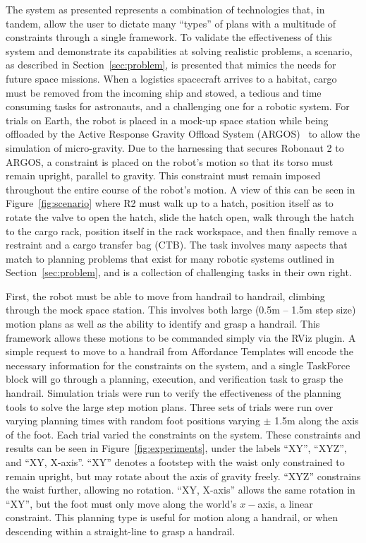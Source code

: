 
The system as presented represents a combination of technologies that, in tandem, allow the user to dictate many ``types'' of plans with a multitude of constraints through a single framework.
To validate the effectiveness of this system and demonstrate its capabilities at solving realistic problems, a scenario, as described in Section~\ref{sec:problem}, is presented that mimics the needs for future space missions.
When a logistics spacecraft arrives to a habitat, cargo must be removed from the incoming ship and stowed, a tedious and time consuming tasks for astronauts, and a challenging one for a robotic system.
For trials on Earth, the robot is placed in a mock-up space station while being offloaded by the Active Response Gravity Offload System (ARGOS)~\cite{Valle2011} to allow the simulation of micro-gravity.
Due to the harnessing that secures Robonaut 2 to ARGOS, a constraint is placed on the robot's motion so that its torso must remain upright, parallel to gravity.
This constraint must remain imposed throughout the entire course of the robot's motion.
A view of this can be seen in Figure~\ref{fig:scenario} where R2 must walk up to a hatch, position itself as to rotate the valve to open the hatch, slide the hatch open, walk through the hatch to the cargo rack, position itself in the rack workspace, and then finally remove a restraint and a cargo transfer bag (CTB).
The task involves many aspects that match to planning problems that exist for many robotic systems outlined in Section~\ref{sec:problem}, and is a collection of challenging tasks in their own right.

First, the robot must be able to move from handrail to handrail, climbing through the mock space station.
This involves both large (0.5m -- 1.5m step size) motion plans as well as the ability to identify and grasp a handrail.
This framework allows these motions to be commanded simply via the RViz plugin.
A simple request to move to a handrail from Affordance Templates will encode the necessary information for the constraints on the system, and a single TaskForce block will go through a planning, execution, and verification task to grasp the handrail.
Simulation trials were run to verify the effectiveness of the planning tools to solve the large step motion plans.
Three sets of trials were run over varying planning times with random foot positions varying $\pm$ 1.5m along the axis of the foot.
Each trial varied the constraints on the system.
These constraints and results can be seen in Figure~\ref{fig:experiments}, under the labels ``XY'', ``XYZ'', and ``XY, X-axis''.
``XY'' denotes a footstep with the waist only constrained to remain upright, but may rotate about the axis of gravity freely.
``XYZ'' constrains the waist further, allowing no rotation.
``XY, X-axis'' allows the same rotation in ``XY'', but the foot must only move along the world's $x-$axis, a linear constraint.
This planning type is useful for motion along a handrail, or when descending within a straight-line to grasp a handrail.

